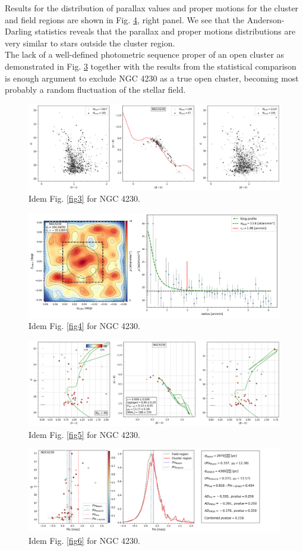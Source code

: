 \documentclass[draft]{aa}
\begin{document}
Results for the distribution of parallax values and proper motions for the
cluster and field regions are shown in Fig. \ref{fig62}, right panel.
We see that the Anderson-Darling statistics reveals that the parallax and
proper motions distributions are very similar to stars outside the
cluster region.\\

The lack of a well-defined photometric sequence proper of an open cluster as
demonstrated in Fig. \ref{fig61} together with the results from
the statistical comparison is enough argument to exclude NGC 4230 as a true open
cluster, becoming most probably a random fluctuation of the stellar field.

\begin{figure}[ht]
    \centering
    \includegraphics[width=\hsize]{../figs/obs_NGC4230.png}
    \caption{Idem Fig. \ref{fig3} for NGC 4230.}
    \label{fig59}
\end{figure}
\begin{figure}[ht]
    \centering
    \includegraphics[width=\hsize]{../figs/dmap_ngc4230.png}
    \caption{Idem Fig. \ref{fig4} for NGC 4230.}
    \label{fig60}
\end{figure}
\begin{figure}[ht]
    \centering
    \includegraphics[width=\hsize]{../figs/cmds_ngc4230.png}
    \caption{Idem Fig. \ref{fig5} for NGC 4230.}
    \label{fig61}
\end{figure}
\begin{figure}[ht]
    \centering
    \includegraphics[width=\hsize]{../figs/plx_NGC4230.png}
    \caption{Idem Fig. \ref{fig6} for NGC 4230.}
    \label{fig62}
\end{figure}
\end{document}
